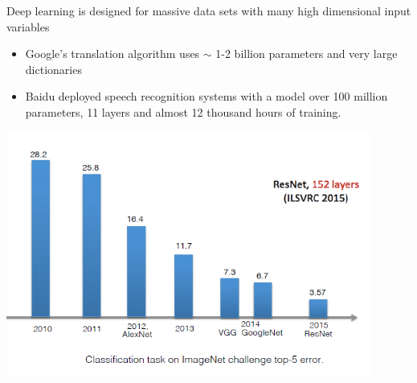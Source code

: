 \documentclass{beamer}
\begin{document}
\begin{frame}
Deep learning is designed for massive data sets with many high dimensional input variables
\begin{itemize}
\item Google’s translation algorithm \cite{Sutskever et al. 2014} uses $\sim$ 1-2 billion parameters
and very large dictionaries
\item Baidu deployed speech recognition systems \cite{Amodei et al. 2016} with a model over 100 million parameters, 11 layers and almost 12 thousand hours of training.
\end{itemize}
\end{frame}
\begin{frame}
\includegraphics[width=0.9\textwidth]{images/deeplearning_evolution.PNG}
\end{frame}

\end{document}
